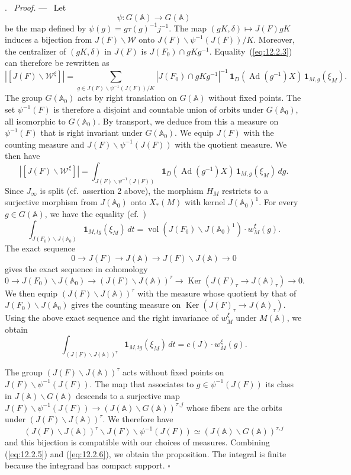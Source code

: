 \documentclass[12pt,a4paper,oneside,english,leqno]{smfart}
\makeatletter
\numberwithin{equation}{subsection}
\numberwithin{theo}{subsection}
\newenvironment{paragr}[1][]{\medskip\refstepcounter{subsection}%
  \par\noindent\hspace*{\parindent}\thesubsection.\ \emph{#1}%
  \@ifundefined{@empty}{}{}\ignorespaces}{\medskip}
\theoremstyle{plain}
\theoremstyle{definition}
\theoremstyle{remark}
\newenvironment{preuve}[1][]{\medskip\noindent\textit{Proof.} #1 ---\ }%
  {\hfill\ensuremath{\square}\medskip}
\DeclareMathOperator{\vol}{vol}
\DeclareMathOperator{\Ad}{Ad}
\DeclareMathOperator{\Ker}{Ker}
\newcommand{\AAA}{\mathbb{A}}
\newcommand{\wc}{\mathcal{W}}
\newcommand{\back}{\backslash}
\makeatother
\begin{document}
\begin{paragr}
\begin{preuve}
Let
$$
\psi:G(\AAA)\to G(\AAA)
$$
be the map defined by $\psi(g)=g\tau(g)^{-1}j^{-1}$. The map $(gK,\delta)\mapsto J(F)gK$ induces a bijection from $J(F)\back\wc$ onto $J(F)\back\psi^{-1}(J(F))/K$. Moreover, the centralizer of $(gK,\delta)$ in $J(F)$ is $J(F_0)\cap gKg^{-1}$. Equality~(\ref{eq:12.2.3}) can therefore be rewritten as
$$
|[J(F)\back\wc^\xi]|=\sum_{g\in J(F)\back\psi^{-1}(J(F))/K} |J(F_0)\cap gKg^{-1}|^{-1}\,\mathbf{1}_D(\Ad(g^{-1})X)\, \mathbf{1}_{M,g}(\xi_M).
$$
The group $G(\AAA_0)$ acts by right translation on $G(\AAA)$ without fixed points. The set $\psi^{-1}(F)$ is therefore a disjoint and countable union of orbits under $G(\AAA_0)$, all isomorphic to $G(\AAA_0)$. By transport, we deduce from this a measure on $\psi^{-1}(F)$ that is right invariant under $G(\AAA_0)$. We equip $J(F)$ with the counting measure and $J(F)\back\psi^{-1}(J(F))$ with the quotient measure. We then have
\begin{equation}\label{eq:12.2.5}
|[J(F)\back\wc^\xi]|=\int_{J(F)\back\psi^{-1}(J(F))}
\mathbf{1}_D(\Ad(g^{-1})X)\,\mathbf{1}_{M,g}(\xi_M)\,dg.
\end{equation}
Since $J_\infty$ is split (cf.\ assertion 2 above), the morphism $H_M$ restricts to a surjective morphism from $J(\AAA_0)$ onto $X_*(M)$ with kernel $J(\AAA_0)^1$. For every $g\in G(\AAA)$, we have the equality (cf.\ \cite[proof of Proposition~11.9.1]{LFPI})
$$
\int_{J(F_0)\back J(\AAA_0)}\mathbf{1}_{M,tg}(\xi_M)\,dt =\vol(J(F_0)\back J(\AAA_0)^1)\cdot w_M^\xi(g).
$$
The exact sequence
$$
0\longrightarrow J(F)\longrightarrow J(\AAA)\longrightarrow J(F)\back J(\AAA)\longrightarrow 0
$$
gives the exact sequence in cohomology
$$
0\longrightarrow J(F_0)\back J(\AAA_0)\longrightarrow (J(F)\back J(\AAA))^\tau\longrightarrow \Ker(J(F)_\tau\to J(\AAA)_\tau)\longrightarrow 0.
$$
We then equip $(J(F)\back J(\AAA))^\tau$ with the measure whose quotient by that of $J(F_0)\back J(\AAA_0)$ gives the counting measure on $\Ker(J(F)_\tau\to J(\AAA)_\tau)$. Using the above exact sequence and the right invariance of $w_M^\xi$ under $M(\AAA)$, we obtain
\begin{equation}\label{eq:12.2.6}
\int_{(J(F)\back J(\AAA))^\tau}\mathbf{1}_{M,tg}(\xi_M)\,dt
=c(J)\cdot w_M^\xi(g).
\end{equation}

The group $(J(F)\back J(\AAA))^\tau$ acts without fixed points on $J(F)\back\psi^{-1}(J(F))$. The map that associates to $g\in\psi^{-1}(J(F))$ its class in $J(\AAA)\back G(\AAA)$ descends to a surjective map $J(F)\back\psi^{-1}(J(F))\to(J(\AAA)\back G(\AAA))^{\tau,j}$ whose fibers are the orbits under $(J(F)\back J(\AAA))^\tau$. We therefore have
$$
(J(F)\back J(\AAA))^\tau\back J(F)\back\psi^{-1}(J(F))\simeq (J(\AAA)\back G(\AAA))^{\tau,j}
$$
and this bijection is compatible with our choices of measures. Combining (\ref{eq:12.2.5}) and (\ref{eq:12.2.6}), we obtain the proposition. The integral is finite because the integrand has compact support.
\end{preuve}


\end{paragr}
\end{document}
